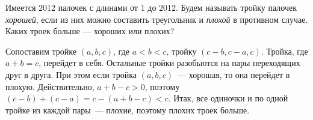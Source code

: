 Имеется 2012 палочек с длинами от 1 до 2012.
Будем называть тройку палочек \emph{хорошей}, если из них можно составить
треугольник и \emph{плохой} в противном случае.
Каких троек больше --- хороших или плохих?

\solution
Сопоставим тройке $(a, b, c)$, где $a < b < c$, тройку $(c - b, c - a, c)$.
Тройка, где $a + b = c$, перейдет в себя.
Остальные тройки разобьются на пары переходящих друг в друга.
При этом если тройка $(a, b, c)$~--- хорошая, то она перейдет в плохую.
Действительно, $a + b - c > 0$, поэтому
$(c - b) + (c - a) = c - (a + b - c) < c$.
Итак, все одиночки и по одной тройке из каждой пары~--- плохие, поэтому плохих
троек больше.

